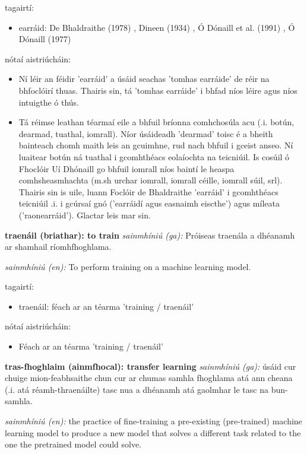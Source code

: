 \documentclass{article}
\begin{document}
tagairtí:
\begin{itemize}
	\item earráid: De Bhaldraithe (1978) \cite{de-bhaldraithe}, Dineen (1934) \cite{dineen}, Ó Dónaill et al. (1991) \cite{focloir-beag}, Ó Dónaill (1977) \cite{odonaill}
\end{itemize}

nótaí aistriúcháin:
\begin{itemize}
	\item Ní léir an féidir 'earráid' a úsáid seachas 'tomhas earráide' de réir na bhfoclóirí thuas. Thairis sin, tá 'tomhas earráide' i bhfad níos léire agus níos intuigthe ó thús.
	\item Tá réimse leathan téarmaí eile a bhfuil bríonna comhchosúla acu (.i. botún, dearmad, tuathal, iomrall). Níor úsáideadh 'dearmad' toisc é a bheith bainteach chomh maith leis an gcuimhne, rud nach bhfuil i gceist anseo. Ní luaitear botún ná tuathal i gcomhthéacs eolaíochta na teicniúil. Is cosúil ó Fhoclóir Uí Dhónaill go bhfuil iomrall níos baintí le  heaspa comhsheasmhachta (m.sh urchar iomrall, iomrall céille, iomrall súil, srl). Thairis sin is uile, luann Foclóir de Bhaldraithe 'earráid' i gcomhthéacs teicniúil .i. i gcúrsaí gnó ('earráidí agus easnaimh eiscthe') agus míleata ('raonearráid'). Glactar leis mar sin.
\end{itemize}


\textbf{traenáil (briathar): to train}
\textit{sainmhíniú (ga):} Próiseas traenála a dhéanamh ar shamhail ríomhfhoghlama.

\textit{sainmhíniú (en):} To perform training on a machine learning model.

tagairtí:
\begin{itemize}
	\item traenáil: féach ar an téarma 'training / traenáil'
\end{itemize}

nótaí aistriúcháin:
\begin{itemize}
	\item Féach ar an téarma 'training / traenáil'
\end{itemize}


\textbf{tras-fhoghlaim (ainmfhocal): transfer learning}
\textit{sainmhíniú (ga):} úsáid cur chuige mion-feabhsaithe chun cur ar chumas samhla fhoghlama atá ann cheana (.i. atá réamh-thraenáilte) tasc nua a dhéanamh atá gaolmhar le tasc na bun-samhla.

\textit{sainmhíniú (en):} the practice of fine-training a pre-existing (pre-trained) machine learning model to produce a new model that solves a different task related to the one the pretrained model could solve.
\end{document}
